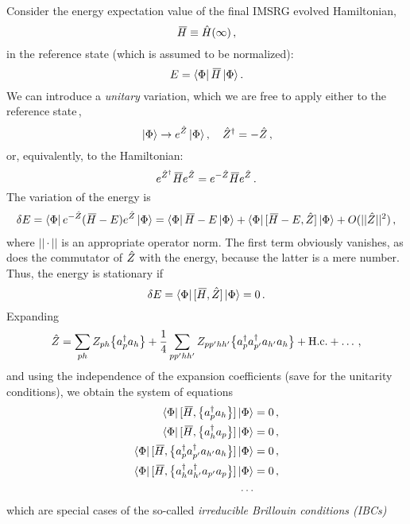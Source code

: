 {Consider the energy expectation value of the final IMSRG evolved Hamiltonian, 
\begin{equation}
  \mkern 3mu\overline{\mkern-3muH} \equiv \hat{H}(\infty)\,,
\end{equation}
in the reference state (which is assumed to be normalized):
\begin{equation}
  E = \langle{\Phi}|\,{\mkern 3mu\overline{\mkern-3muH}}\,|{\Phi}\rangle\,.
\end{equation}
We can introduce a \emph{unitary} variation, which we are free to apply 
either to the reference state\,,
\begin{equation}
  \,|{\Phi}\rangle\rightarrow e^{\hat{Z}}\,|{\Phi}\rangle\,,\quad\hat{Z}^\dag=-\hat{Z}\,,
\end{equation}
or, equivalently, to the Hamiltonian:
\begin{equation}
  e^{\hat{Z}^\dag}\mkern 3mu\overline{\mkern-3muH} e^{\hat{Z}} = e^{-\hat{Z}}\mkern 3mu\overline{\mkern-3muH} e^{\hat{Z}}\,.
\end{equation}
The variation of the energy is
\begin{align}
  \delta E = \langle{\Phi}|\,{e^{-\hat{Z}}(\mkern 3mu\overline{\mkern-3muH} - E) e^{\hat{Z}}}\,|{\Phi}\rangle 
           = \langle{\Phi}|\,{\mkern 3mu\overline{\mkern-3muH}-E}\,|{\Phi}\rangle + \langle{\Phi}|\,{[{\mkern 3mu\overline{\mkern-3muH}-E},{\hat{Z}}]}\,|{\Phi}\rangle + O(||\hat{Z}||^2)\,,
\end{align}
where $||\cdot||$ is an appropriate operator norm. The first term obviously 
vanishes, as does the commutator of $\hat{Z}$ with the energy, because the latter
is a mere number. Thus, the energy is stationary if
\begin{equation}
  \delta E = \langle{\Phi}|\,{[{\mkern 3mu\overline{\mkern-3muH}},{\hat{Z}}]}\,|{\Phi}\rangle = 0\,. 
\end{equation}
Expanding 
\begin{equation}
  \hat{Z} =\sum_{ph} Z_{ph}\big\{a^\dag_{p}a_{h}\big\} + \frac{1}{4}\sum_{pp'hh'} Z_{pp'hh'}\big\{a^\dag_{p}a^\dag_{p'}a_{h'}a_{h}\big\} 
        + \text{H.c.} + \ldots\,,
\end{equation}
and using the independence of the expansion coefficients (save for the unitarity
conditions), we obtain the system of equations
\begin{align}
  \langle{\Phi}|\,{[{\mkern 3mu\overline{\mkern-3muH}},{\big\{a^\dag_{p}a_{h}\big\}}]}\,|{\Phi}\rangle &= 0 \,,\\
  \langle{\Phi}|\,{[{\mkern 3mu\overline{\mkern-3muH}},{\big\{a^\dag_{h}a_{p}\big\}}]}\,|{\Phi}\rangle &= 0 \,,\\
  \langle{\Phi}|\,{[{\mkern 3mu\overline{\mkern-3muH}},{\big\{a^\dag_{p}a^\dag_{p'}a_{h'}a_{h}\big\}}]}\,|{\Phi}\rangle &= 0 \,,\\
  \langle{\Phi}|\,{[{\mkern 3mu\overline{\mkern-3muH}},{\big\{a^\dag_{h}a^\dag_{h'}a_{p'}a_{p}\big\}}]}\,|{\Phi}\rangle &= 0 \,,\\
  \ldots\notag
\end{align}
which are special cases of the so-called \emph{irreducible Brillouin conditions (IBCs)}
}
